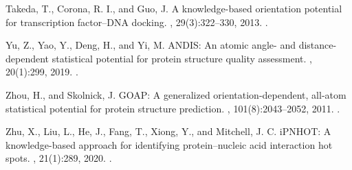 \documentclass[12pt,a4paper]{report}
\begin{document}
Takeda, T., Corona, R. I., and Guo, J.
\newblock A knowledge-based orientation potential for transcription factor--DNA docking.
, 29(3):322--330, 2013.
\newblock {}.

Yu, Z., Yao, Y., Deng, H., and Yi, M.
\newblock ANDIS: An atomic angle- and distance-dependent statistical potential for protein structure quality assessment.
, 20(1):299, 2019.
\newblock {}.

Zhou, H., and Skolnick, J.
\newblock GOAP: A generalized orientation-dependent, all-atom statistical potential for protein structure prediction.
, 101(8):2043--2052, 2011.
\newblock {}.

Zhu, X., Liu, L., He, J., Fang, T., Xiong, Y., and Mitchell, J. C.
\newblock iPNHOT: A knowledge-based approach for identifying protein--nucleic acid interaction hot spots.
, 21(1):289, 2020.
\newblock {}.



\printindex
\end{document}
